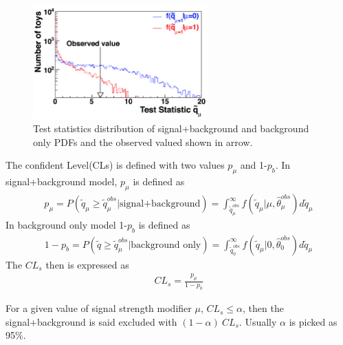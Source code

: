 \begin{figure}[!tbp] 
\centering
\includegraphics[width=0.6\textwidth]{chapter7/Test_statistics.png}
\caption{Test statistics distribution of signal+background and background only PDFs and the observed valued shown in arrow.}
\label{fig:teststatistics}
\end{figure}
 
The confident Level(CLs) is defined with two values $p_{\mu}$ and 1-$p_{b}$. In signal+background model, $p_{\mu}$ is defined as
\begin{align*}
p_{\mu}=P(\tilde{q}_{\mu}\geq  \tilde{q}_{\mu}^{obs}  |\textrm{signal+background})=\int^{\infty}_{\tilde{q}_{\mu}^{obs}}f(\tilde{q}_{\mu}|\mu,\hat{\theta}_{\mu}^{obs})d \tilde{q}_{\mu}
\end{align*}
In background only model 1-$p_{b}$ is defined as
\begin{align*}
1-p_{b}=P(\tilde{q}\geq  \tilde{q}_{\mu}^{obs} | \textrm{background only})=\int^{\infty}_{\tilde{q}_{0}^{obs}}f(\tilde{q}_{\mu}|0,\hat{\theta}_{0}^{obs})d \tilde{q}_{\mu}
\end{align*}
The $CL_{s}$ then is expressed as
\begin{align*}
CL_{s}=\frac{p_{\mu}}{1-p_{b}}
\end{align*}

For a given value of signal strength modifier $\mu$, $CL_{s}\leq\alpha$, then the signal+background is said excluded with $(1-\alpha)~ CL_{s}$. Usually $\alpha$ is picked as 95\%.


